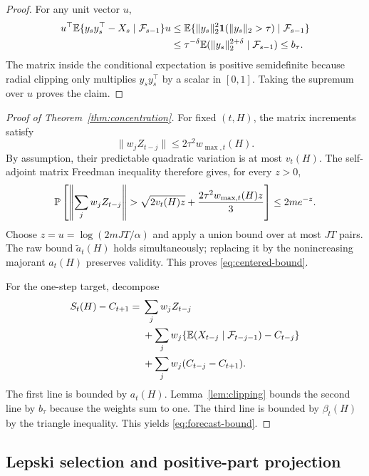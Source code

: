 \begin{proof}
For any unit vector $u$,
\begin{align}
 u^\top\mathbb{E}\{y_sy_s^\top-X_s\mid\mathcal{F}_{s-1}\}u
 &\le \mathbb{E}\{\|y_s\|_2^2\mathbf{1}(\|y_s\|_2>\tau)\mid\mathcal{F}_{s-1}\}\\
 &\le \tau^{-\delta}\mathbb{E}(\|y_s\|_2^{2+\delta}\mid\mathcal{F}_{s-1})
 \le b_\tau.
\end{align}
The matrix inside the conditional expectation is positive semidefinite because radial clipping only multiplies $y_sy_s^\top$ by a scalar in $[0,1]$.  Taking the supremum over $u$ proves the claim.
\end{proof}

\begin{proof}[Proof of Theorem~\ref{thm:concentration}]
For fixed $(t,H)$, the matrix increments satisfy
\begin{equation}
 \|w_jZ_{t-j}\|\le 2\tau^2w_{\max,t}(H).
\end{equation}
By assumption, their predictable quadratic variation is at most $v_t(H)$.  The self-adjoint matrix Freedman inequality \citep{tropp2011} therefore gives, for every $z>0$,
\begin{equation}
 \Pp\left[
 \left\|\sum_jw_jZ_{t-j}\right\|>
 \sqrt{2v_t(H)z}+\frac{2\tau^2w_{\max,t}(H)z}{3}
 \right]\le 2m e^{-z}.
\end{equation}
Choose $z=u=\log(2mJT/\alpha)$ and apply a union bound over at most $JT$ pairs.  The raw bound $\widetilde a_t(H)$ holds simultaneously; replacing it by the nonincreasing majorant $a_t(H)$ preserves validity.  This proves \eqref{eq:centered-bound}.

For the one-step target, decompose
\begin{align}
 S_t(H)-C_{t+1}
={}&\sum_jw_jZ_{t-j}\\
&+\sum_jw_j\{\mathbb{E}(X_{t-j}\mid\mathcal{F}_{t-j-1})-C_{t-j}\}\\
&+\sum_jw_j(C_{t-j}-C_{t+1}).
\label{eq:appendix-decomp}
\end{align}
The first line is bounded by $a_t(H)$.  Lemma~\ref{lem:clipping} bounds the second line by $b_\tau$ because the weights sum to one.  The third line is bounded by $\beta_t(H)$ by the triangle inequality.  This yields \eqref{eq:forecast-bound}.
\end{proof}

\subsection{Lepski selection and positive-part projection}

